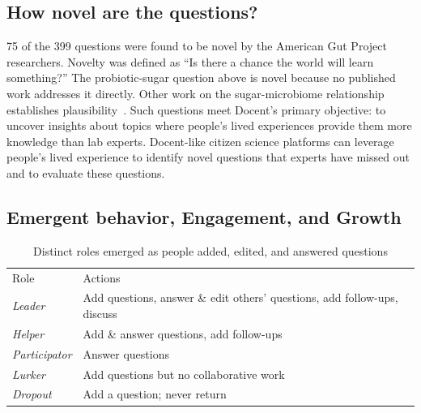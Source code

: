 \subsection{How novel are the questions?}
75 of the 399 questions were found to be novel by the American Gut Project researchers. Novelty was defined as “Is there a chance the world will learn something?” The probiotic-sugar question above is novel because no published work addresses it directly. Other work on the sugar-microbiome relationship establishes plausibility~\cite{Haukioja2008}. Such questions meet Docent’s primary objective: to uncover insights about topics where people’s lived experiences provide them more knowledge than lab experts. Docent-like citizen science platforms can leverage people’s lived experience to identify novel questions that experts have missed out and to evaluate these questions.

\subsection{Emergent behavior, Engagement, and Growth}

\vspace{0.25in}
\begin{table}[!ht]
\caption[Distinct roles emerged as people added, edited, and
answered questions]
{Distinct roles emerged as people added, edited, and
answered questions}

\vspace{-0.25in}
\begin{center}
\renewcommand{\arraystretch}{1.5}
\begin{tabular}{p{1in}p{4.5in}}
\hline
Role & Actions\\
\textit{Leader} 		& Add questions, answer \& edit others’ questions, add follow-ups, discuss \\
\textit{Helper} 		&  Add \& answer questions, add follow-ups\\
\textit{Participator} 	&  Answer questions\\
\textit{Lurker} 		&  Add questions but no collaborative work\\
\textit{Dropout} 	&  Add a question; never return\\
\hline
\end{tabular}
\end{center}
\label{d-tab:results2}
\end{table}


